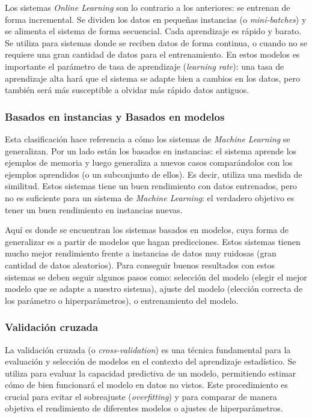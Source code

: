 \documentclass[12pt,a4paper]{article}
\begin{document}
Los sistemas \textit{Online Learning} son lo contrario a los anteriores: se entrenan de forma incremental. Se dividen los datos en pequeñas instancias (o \textit{mini-batches}) y se alimenta el sistema de forma secuencial. Cada aprendizaje es rápido y barato. Se utiliza para sistemas donde se reciben datos de forma continua, o cuando no se requiere una gran cantidad de datos para el entrenamiento. En estos modelos es importante el parámetro de tasa de aprendizaje (\textit{learning rate}): una tasa de aprendizaje alta hará que el sistema se adapte bien a cambios en los datos, pero también será más susceptible a olvidar más rápido datos antiguos.


\subsubsection{Basados en instancias y Basados en modelos}
Esta clasificación hace referencia a cómo los sistemas de \textit{Machine Learning} se generalizan. Por un lado están los basados en instancias: el sistema aprende los ejemplos de memoria y luego generaliza a nuevos casos comparándolos con los ejemplos aprendidos (o un subconjunto de
ellos). Es decir, utiliza una medida de similitud. Estos sistemas tiene un buen rendimiento con datos entrenados, pero no es suficiente para un sistema de \textit{Machine Learning}: el verdadero objetivo es tener un buen rendimiento en instancias nuevas.


Aquí es donde se encuentran los sistemas basados en modelos, cuya forma de generalizar es a partir de modelos que hagan predicciones. Estos sistemas tienen mucho mejor rendimiento frente a instancias de datos muy ruidosas (gran cantidad de datos aleatorios). Para conseguir buenos resultados con estos sistemas se deben seguir algunos pasos como: selección del modelo (elegir el mejor modelo que se adapte a nuestro sistema), ajuste del modelo (elección correcta de los parámetro o hiperparámetros),  o entrenamiento del modelo.

\subsubsection{Validación cruzada}\label{cross-validation}
La validación cruzada (o \textit{cross-validation}) es una técnica fundamental para la evaluación y selección de modelos en el contexto del aprendizaje estadístico. Se utiliza para evaluar la capacidad predictiva de un modelo, permitiendo estimar cómo de bien funcionará el modelo en datos no vistos. Este procedimiento es crucial para evitar el sobreajuste (\textit{overfitting}) y para comparar de manera objetiva el rendimiento de diferentes modelos o ajustes de hiperparámetros.
\end{document}
